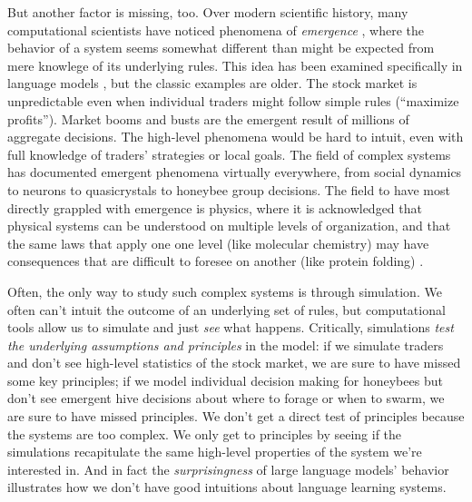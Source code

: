 \documentclass[output=paper,colorlinks,citecolor=brown
]{langscibook}
\begin{document}
But another factor is missing, too. Over modern scientific history, many computational scientists have noticed phenomena of \emph{emergence} \citep{goldstein1999emergence,mcclelland2010emergence}, where the behavior of a system seems somewhat different than might be expected from mere knowlege of its underlying rules. This idea has been examined specifically in language models \citep{wei2022emergent,manning2020emergent}, but the classic examples are older. The stock market is unpredictable even when individual traders might follow simple rules (``maximize profits''). Market booms and busts are the emergent result of millions of aggregate decisions. The high-level phenomena would be hard to intuit, even with full knowledge of traders' strategies or local goals. The field of complex systems has documented emergent phenomena virtually everywhere, from social dynamics to neurons to quasicrystals to honeybee group decisions. The field to have most directly grappled with emergence is physics, where it is acknowledged that physical systems can be understood on multiple levels of organization, and that the same laws that apply one one level (like molecular chemistry) may have consequences that are difficult to foresee on another (like protein folding) \citep{anderson1972more,crutchfield1994anything,crutchfield1994calculi}. 

Often, the only way to study such complex systems is through simulation. We often can't intuit the outcome of an underlying set of rules, but computational tools allow us to simulate and just \emph{see} what happens. Critically, simulations \emph{test the underlying assumptions and principles} in the model: if we simulate traders and don't see high-level statistics of the stock market, we are sure to have missed some key principles; if we model individual decision making for honeybees but don't see emergent hive decisions about where to forage or when to swarm, we are sure to have missed principles. We don't get a direct test of principles because the systems are too complex. We only get to principles by seeing if the simulations recapitulate the same high-level properties of the system we're interested in. And in fact the \emph{surprisingness} of large language models' behavior illustrates how we don't have good intuitions about language learning systems. 

\end{document}
